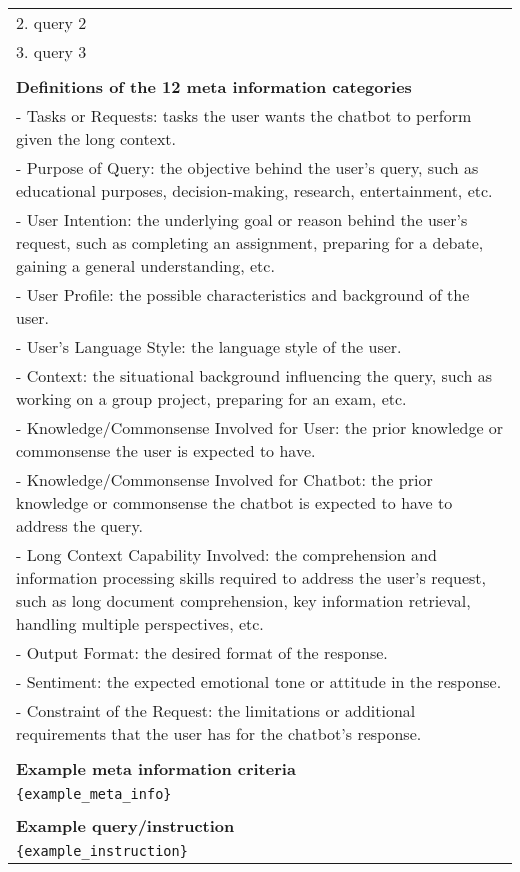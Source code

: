 \begin{table}[h!]
\begin{minipage}{\textwidth}
\begin{tcolorbox}
\begin{tabular}{p{}}
    2. {{query 2}}\\
    3. {{query 3}}\\
    \\
    \textbf{Definitions of the 12 meta information categories}\\
    - Tasks or Requests: tasks the user wants the chatbot to perform given the long context.\\ 
    - Purpose of Query: the objective behind the user's query, such as educational purposes, decision-making, research, entertainment, etc.\\
    - User Intention: the underlying goal or reason behind the user's request, such as completing an assignment, preparing for a debate, gaining a general understanding, etc.\\
    - User Profile: the possible characteristics and background of the user.\\
    - User's Language Style: the language style of the user.\\
    - Context: the situational background influencing the query, such as working on a group project, preparing for an exam, etc.\\
    - Knowledge/Commonsense Involved for User: the prior knowledge or commonsense the user is expected to have.\\
    - Knowledge/Commonsense Involved for Chatbot: the prior knowledge or commonsense the chatbot is expected to have to address the query.\\
    - Long Context Capability Involved: the comprehension and information processing skills required to address the user's request, such as long document comprehension, key information retrieval, handling multiple perspectives, etc.\\
    - Output Format: the desired format of the response.\\
    - Sentiment: the expected emotional tone or attitude in the response.\\
    - Constraint of the Request: the limitations or additional requirements that the user has for the chatbot's response.\\
    \\
    \textbf{Example meta information criteria}\\
    {\tt \{example{\_}meta{\_}info\}}\\
    \\
    \textbf{Example query/instruction}\\
    {\tt \{example{\_}instruction\}}\\

\end{tabular}
\end{tcolorbox}
\end{minipage}
\end{table}

